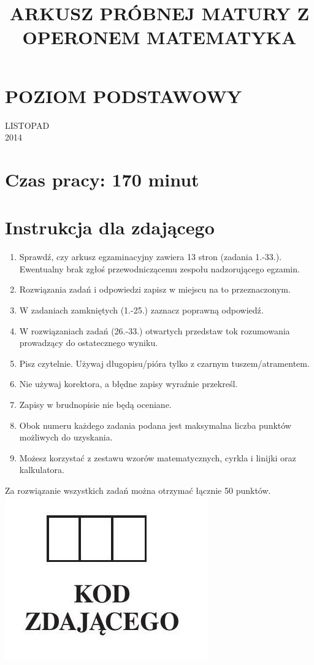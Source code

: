\documentclass[10pt]{article}
\title{ARKUSZ PRÓBNEJ MATURY Z OPERONEM MATEMATYKA }
\author{}
\date{}
\begin{document}
\maketitle
\section*{POZIOM PODSTAWOWY}
LISTOPAD\\
2014

\section*{Czas pracy: 170 minut}
\section*{Instrukcja dla zdającego}
\begin{enumerate}
  \item Sprawdź, czy arkusz egzaminacyjny zawiera 13 stron (zadania 1.-33.). Ewentualny brak zgłoś przewodniczącemu zespołu nadzorującego egzamin.
  \item Rozwiązania zadań i odpowiedzi zapisz w miejscu na to przeznaczonym.
  \item W zadaniach zamkniętych (1.-25.) zaznacz poprawną odpowiedź.
  \item W rozwiązaniach zadań (26.-33.) otwartych przedstaw tok rozumowania prowadzący do ostatecznego wyniku.
  \item Pisz czytelnie. Używaj długopisu/pióra tylko z czarnym tuszem/atramentem.
  \item Nie używaj korektora, a błędne zapisy wyraźnie przekreśl.
  \item Zapisy w brudnopisie nie będą oceniane.
  \item Obok numeru każdego zadania podana jest maksymalna liczba punktów możliwych do uzyskania.
  \item Możesz korzystać z zestawu wzorów matematycznych, cyrkla i linijki oraz kalkulatora.
\end{enumerate}

Za rozwiązanie wszystkich zadań można otrzymać łącznie 50 punktów.\\
\includegraphics[max width=\textwidth, center]{2024_11_21_fd9e49107d1ddcec5cd8g-01}
\end{document}
